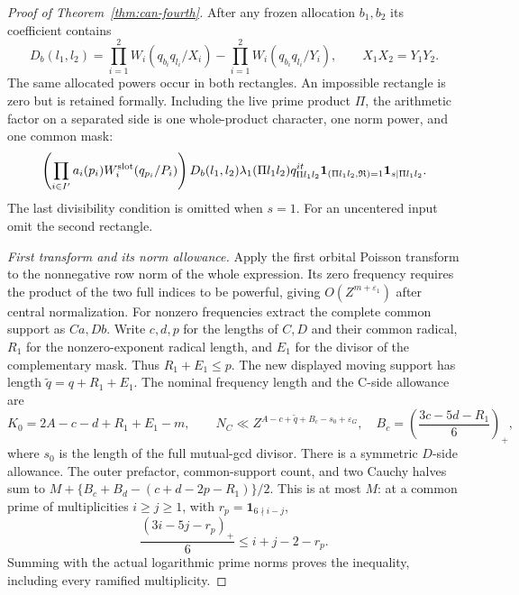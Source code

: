\documentclass[11pt,a4paper]{article}
\numberwithin{equation}{section}
\theoremstyle{definition}
\theoremstyle{remark}
\newcommand{\eps}{\varepsilon}
\begin{document}
\begin{proof}[Proof of Theorem~\ref{thm:can-fourth}]
After any frozen allocation $b_1,b_2$ its coefficient contains
\[
 D_b(l_1,l_2)=
  \prod_{i=1}^2W_i(q_{b_i}q_{l_i}/X_i)
    -\prod_{i=1}^2W_i(q_{b_i}q_{l_i}/Y_i),
 \qquad X_1X_2=Y_1Y_2.
\]
The same allocated powers occur in both rectangles.
An impossible rectangle is zero but is retained formally.
Including the live prime product $\Pi$, the arithmetic factor
on a separated side is one whole-product character, one norm
power, and one common mask:
\begin{equation}\label{eq:can-centered-class}
 \left(\prod_{i\in I'}a_i(p_i)W_i^{\rm slot}(q_{p_i}/P_i)\right)
 D_b(l_1,l_2)\lambda_1(\Pi l_1l_2)
 q_{\Pi l_1l_2}^{it}
 \mathbf1_{(\Pi l_1l_2,\mathfrak R)=1}
 \mathbf1_{s\mid\Pi l_1l_2}.
\end{equation}
The last divisibility condition is omitted when $s=1$.
For an uncentered input omit the second rectangle.

\smallskip\noindent\emph{First transform and its norm allowance.}
Apply the first orbital Poisson transform to the nonnegative
row norm of the whole expression.  Its zero frequency requires
the product of the two full indices to be powerful, giving
$O(Z^{m+\eps_1})$ after central normalization.
For nonzero frequencies extract the complete common support
as $Ca,Db$.  Write $c,d,p$ for the lengths of $C,D$ and their
common radical, $R_1$ for the nonzero-exponent radical length,
and $E_1$ for the divisor of the complementary mask.  Thus
$R_1+E_1\le p$.  The new displayed moving support has length
$\widetilde q=q+R_1+E_1$.
The nominal frequency length and the C-side allowance are
\begin{equation}\label{eq:can-plain-first}
 K_0=2A-c-d+R_1+E_1-m,\qquad
 N_C\ll Z^{A-c+\widetilde q+B_c-s_0+\eps_G},
 \quad B_c=\left(\frac{3c-5d-R_1}{6}\right)_+,
\end{equation}
where $s_0$ is the length of the full mutual-gcd divisor.
There is a symmetric $D$-side allowance.
The outer prefactor, common-support count, and two Cauchy
halves sum to
$M+\{B_c+B_d-(c+d-2p-R_1)\}/2$.
This is at most $M$: at a common prime of multiplicities
$i\ge j\ge1$, with $r_p=\mathbf1_{6\nmid i-j}$,
\[
 \frac{(3i-5j-r_p)_+}{6}\le i+j-2-r_p.
\]
Summing with the actual logarithmic prime norms proves the
inequality, including every ramified multiplicity.


\end{proof}
\end{document}

